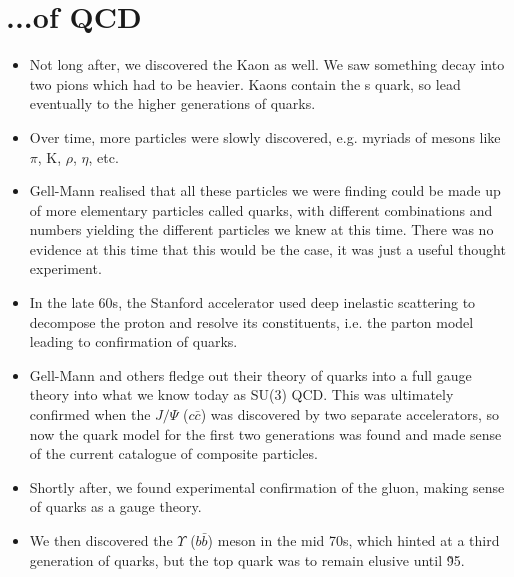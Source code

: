 \documentclass[relqm.tex]{subfiles}
\begin{document}
\section{...of QCD}
\begin{itemize}
    \item Not long after, we discovered the Kaon as well. 
        We saw something decay into two pions which had to be heavier. 
        Kaons contain the s quark, so lead eventually to the higher generations of quarks. 
    \item Over time, more particles were slowly discovered, e.g. myriads of mesons like $\pi$, K, $\rho$, $\eta$, etc. 
    \item Gell-Mann realised that all these particles we were finding could be made up of more elementary particles called quarks, with different combinations and numbers yielding the different particles we knew at this time.
        There was no evidence at this time that this would be the case, it was just a useful thought experiment. 
    \item In the late 60s, the Stanford accelerator used deep inelastic scattering to decompose the proton and resolve its constituents, i.e. the parton model leading to confirmation of quarks.
    \item Gell-Mann and others fledge out their theory of quarks into a full gauge theory into what we know today as SU(3) QCD.
        This was ultimately confirmed when the $J/\Psi$ ($c\bar{c}$) was discovered by two separate accelerators, so now the quark model for the first two generations was found and made sense of the current catalogue of composite particles.
    \item Shortly after, we found experimental confirmation of the gluon, making sense of quarks as a gauge theory. 
    \item We then discovered the $\Upsilon$ ($b\bar{b}$) meson in the mid 70s, which hinted at a third generation of quarks, but the top quark was to remain elusive until \~95.
\end{itemize}
\end{document}
